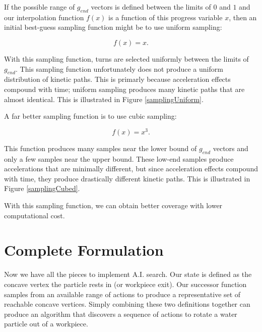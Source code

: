If the possible range of $g_{end}$ vectors is defined between the limits of $0$ and $1$ and our interpolation function $f(x)$ is a function of this progress variable $x$, then an initial best-guess sampling function might be to use uniform sampling:

$$
f(x) = x.
$$

With this sampling function, turns are selected uniformly between the limits of $g_{end}$. This sampling function unfortunately does not produce a uniform distribution of kinetic paths. This is primarly because acceleration effects compound with time; uniform sampling produces many kinetic paths that are almost identical. This is illustrated in Figure \ref{samplingUniform}.


A far better sampling function is to use cubic sampling:

$$
f(x) = x^3.
$$

This function produces many samples near the lower bound of $g_{end}$ vectors and only a few samples near the upper bound. These low-end samples produce accelerations that are minimally different, but since acceleration effects compound with time, they produce drastically different kinetic paths. This is illustrated in Figure \ref{samplingCubed}.


With this sampling function, we can obtain better coverage with lower computational cost.

	\section{Complete Formulation}

Now we have all the pieces to implement A.I. search. Our state is defined as the concave vertex the particle rests in (or workpiece exit). Our successor function samples from an available range of actions to produce a representative set of reachable concave vertices. Simply combining these two definitions together can produce an algorithm that discovers a sequence of actions to rotate a water particle out of a workpiece.

